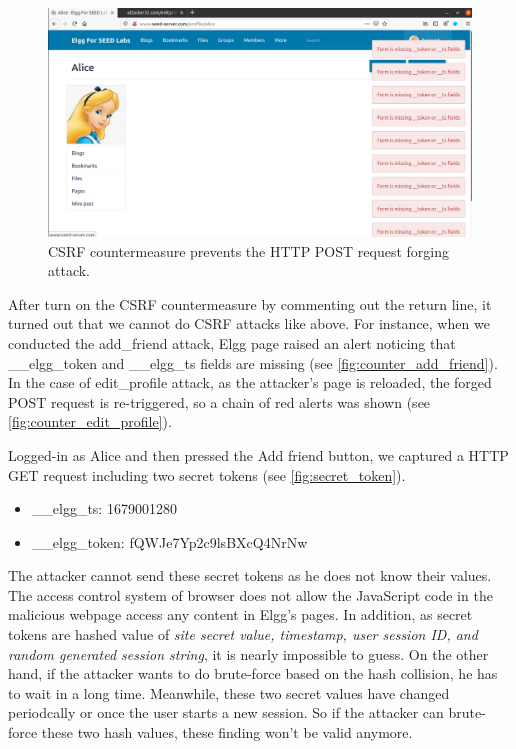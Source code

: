 \begin{figure}
    \centering
    \includegraphics[height=\textheight,width=\textwidth,keepaspectratio]
    {figures/edit_profile_countermeasure.png}
    \caption{CSRF countermeasure prevents the HTTP POST request forging attack.}
    \label{fig:counter_edit_profile}
\end{figure}

After turn on the CSRF countermeasure by commenting out the {\selectfont
return} line, it turned out that we cannot do CSRF attacks like above. For instance,
when we conducted the {\selectfont add\_friend} attack, Elgg page raised
an alert noticing that {\selectfont \_\_elgg\_token} and
{\selectfont \_\_elgg\_ts} fields are missing
(see \autoref{fig:counter_add_friend}). In the case of {\selectfont edit\_profile}
attack, as the attacker's page is reloaded, the forged POST request is re-triggered, so
a chain of red alerts was shown (see \autoref{fig:counter_edit_profile}).

Logged-in as Alice and then pressed the {\selectfont Add friend} button,
we captured a HTTP GET request including two secret tokens (see \autoref{fig:secret_token}).

\begin{itemize}
    \item \_\_elgg\_ts: 1679001280
    \item \_\_elgg\_token: fQWJe7Yp2c9lsBXcQ4NrNw
\end{itemize}

The attacker cannot send these secret tokens as he does not know their values.
The access control system of browser does not allow the JavaScript code in the
malicious webpage access any content in Elgg's pages. In addition, as secret
tokens are hashed value of \emph{site secret value, timestamp, user session ID,
and random generated session string}, it is nearly impossible to guess. On the
other hand, if the attacker wants to do brute-force based on the hash collision,
he has to wait in a long time. Meanwhile, these two secret values have changed
periodcally or once the user starts a new session. So if the attacker can
brute-force these two hash values, these finding won't be valid anymore.
